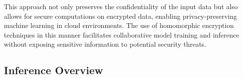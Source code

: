 ﻿\documentclass[conference]{IEEEtran}
\begin{document}
This approach not only preserves the confidentiality of the input data but also allows for secure computations on encrypted data, enabling privacy-preserving machine learning in cloud environments. The use of homomorphic encryption techniques in this manner facilitates collaborative model training and inference without exposing sensitive information to potential security threats.





\subsection{Inference Overview}
\end{document}
